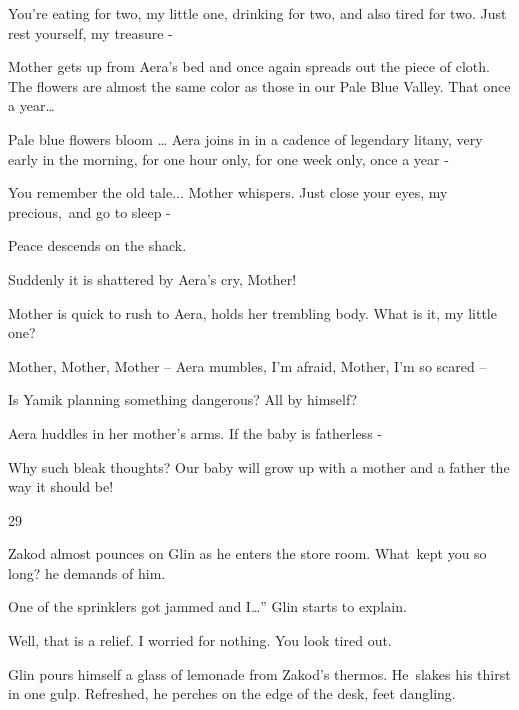 \documentclass[letterpaper]{article}
\begin{document}
{\textquotedbl}You're eating for two, my little one, drinking for two, and also tired for two. Just rest yourself, my
treasure -{\textquotedbl}~ 

Mother gets up from Aera's bed and once again spreads out the piece of cloth. {\textquotedbl}The flowers are almost the
same color as those in our Pale Blue Valley. That once a year{\dots}{\textquotedbl} 

{\textquotedbl}Pale blue flowers bloom {\dots}{\textquotedbl} Aera joins in in a cadence of legendary litany,
{\textquotedbl}very early in the morning, for one hour only, for one week only, once a year -{\textquotedbl}

{\textquotedbl}You remember the old tale...{\textquotedbl} Mother whispers. {\textquotedbl}Just close your eyes, my
precious,~and go to sleep -{\textquotedbl} 

Peace descends on the shack. 

Suddenly it is shattered by Aera's cry, {\textquotedbl}Mother!{\textquotedbl} 

Mother is quick to rush to Aera, holds her trembling body. {\textquotedbl}What is it, my little one?{\textquotedbl} 

{\textquotedbl}Mother, Mother, Mother --{\textquotedbl} Aera mumbles, {\textquotedbl}I'm afraid, Mother, I'm so scared
--{\textquotedbl} 

{\textquotedbl}Is Yamik planning something dangerous? All by himself?{\textquotedbl} 

Aera huddles in her mother's arms. {\textquotedbl}If the baby is fatherless -{\textquotedbl}

{\textquotedbl}Why such bleak thoughts? Our baby will grow up with a mother and a father the way it should
be!{\textquotedbl}


\bigskip

29~~\ 

Zakod almost pounces on Glin as he enters the store room. {\textquotedbl}What\ kept you so long?{\textquotedbl} he
demands of him.\ 

{\textquotedbl}One of the sprinklers got jammed and I{\dots}{}'' Glin starts to explain. 

{\textquotedbl}Well, that is a relief. I worried for nothing. You look tired out.{\textquotedbl} 

Glin pours himself a glass of lemonade from Zakod's thermos. He\textcolor[rgb]{0.0,0.4392157,0.7529412}{\ }slakes his
thirst in one gulp. Refreshed, he perches on the edge of the desk, feet dangling. 
\end{document}
